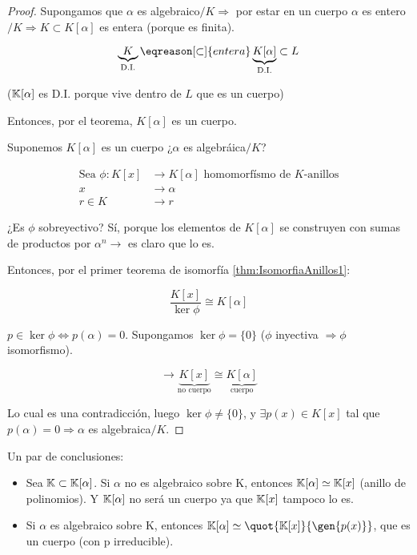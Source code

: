 	\begin{proof}

	\proofpart{$\implies$}

		Supongamos que $\alpha$ es algebraico$/K \Rightarrow$ por estar en un cuerpo $ \alpha$ es entero$/K \Rightarrow K \subset K[\alpha]$ es entera (porque es finita).

		\[ \underbrace{K}_{\text{D.I.}} \eqreason[\subset]{entera} \underbrace{K[\alpha]}_{\text{D.I.}} \subset L\]
		
		($\mathbb{K}[\alpha]$ es D.I. porque vive dentro de $L$ que es un cuerpo)

		Entonces, por el teorema, $K[\alpha]$ es un cuerpo.

	\proofpart{$\impliedby$}

		Suponemos $K[\alpha]$ es un cuerpo ¿$\alpha$ es algebráica$/K$?

		\begin{align*}
			\text{Sea } \phi: K[x] &\longrightarrow K[\alpha] \text{ homomorfísmo de }K\text{-anillos}\\
			x &\longrightarrow \alpha \\
			r\in K &\longrightarrow r
		\end{align*}

		¿Es $\phi$ sobreyectivo? Sí, porque los elementos de $K[\alpha]$ se construyen con sumas de productos por $\alpha^n \rightarrow $ es claro que lo es.

		Entonces, por el primer teorema de isomorfía \ref{thm:IsomorfiaAnillos1}:

		\[ \frac{K[x]}{\ker \phi} \cong K[\alpha]\]

		$p \in \ker \phi \Leftrightarrow p(\alpha) = 0 $. Supongamos $\ker \phi = \{0\}$ ($\phi$ inyectiva $\Rightarrow \phi$ isomorfismo).

		\[ \rightarrow \underbrace{K[x]}_{\text{no cuerpo}} \cong \underbrace{K[\alpha]}_{\text{cuerpo}}  \]

		Lo cual es una contradicción, luego $\ker \phi \neq \{0\}$, y $\exists p(x) \in K[x]$ tal que $p(\alpha) = 0 \Rightarrow \alpha $ es algebraica$/K$.
	\end{proof}



Un par de conclusiones:
\begin{itemize}
\item Sea  $\mathbb{K} \subset \mathbb{K}[\alpha]$. Si $\alpha$ no es algebraico sobre K, entonces $\mathbb{K}[\alpha]\simeq \mathbb{K}[x]$ (anillo de polinomios). Y $\mathbb{K}[\alpha]$ no será un cuerpo ya que $\mathbb{K}[x]$ tampoco lo es.
\item Si $\alpha$ es algebraico sobre K, entonces $\K[\alpha] \simeq \quot{\K[x]}{\gen{p(x)}}$, que es un cuerpo (con p irreducible).
\end{itemize}

